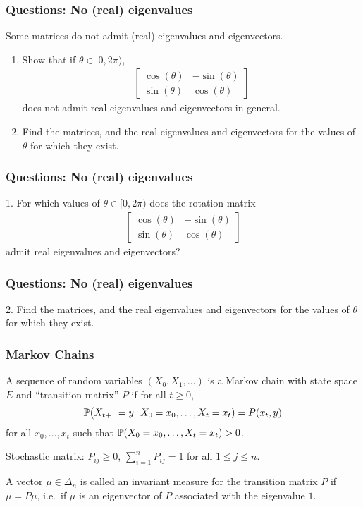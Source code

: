 \documentclass{beamer}
\begin{document}
\begin{frame}[t]
\frametitle{Questions: No (real) eigenvalues}
Some matrices do not admit (real) eigenvalues and eigenvectors. 
\begin{enumerate}
\item Show that if $\theta \in [0,2\pi)$,
\begin{align*}
\begin{bmatrix}
\cos(\theta) & -\sin(\theta) \\
\sin(\theta) & \cos(\theta)
\end{bmatrix}
\end{align*}
does not admit real eigenvalues and eigenvectors in general.
\item Find the matrices, and the real eigenvalues and eigenvectors for the values of $\theta$ for which they exist.
\end{enumerate}
\end{frame}

\begin{frame}[t]
\frametitle{Questions: No (real) eigenvalues}
1. For which values of $\theta \in [0,2\pi)$ does the rotation matrix
\begin{align*}
\begin{bmatrix}
\cos(\theta) & -\sin(\theta) \\
\sin(\theta) & \cos(\theta)
\end{bmatrix}
\end{align*}
admit real eigenvalues and eigenvectors?
\pause
\end{frame}

\begin{frame}[t]
\frametitle{Questions: No (real) eigenvalues}
2. Find the matrices, and the real eigenvalues and eigenvectors for the values of $\theta$ for which they exist.
\pause
\end{frame}

\begin{frame}[t]

\end{frame}

\iffalse
\begin{frame}[t]
\frametitle{Markov Chains}
\begin{definition}
	A sequence of random variables $(X_0, X_1, \dots)$ is a Markov chain with state space $E$ and ``transition matrix'' $P$ if for all $t \geq 0$, 
	$$
	\P\big( X_{t+1} = y \, \big| \, X_0= x_0, \dots, X_t = x_t ) = P(x_t,y)
	$$
	for all $x_0, \dots, x_t$ such that $\P(X_0 = x_0, \dots, X_t = x_t) >0$.
\end{definition}
Stochastic matrix: $P_{ij} \geq 0$, $\sum_{i=1}^n P_{ij} = 1$ for all $1 \leq j \leq n$.
\begin{definition}
	A vector $\mu \in \Delta_n$ is called an invariant measure for the transition matrix $P$ if $\mu = P \mu$, i.e.\ if $\mu$ is an eigenvector of $P$ associated with the eigenvalue $1$.
\end{definition}
\end{frame}
\end{document}
